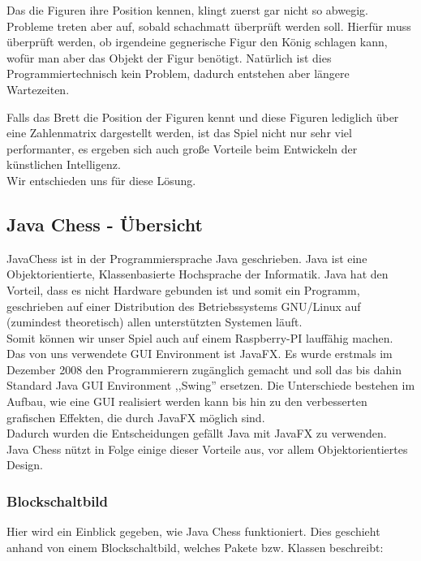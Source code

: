 \documentclass[12pt,a4paper]{article}
\begin{document}
{Das die Figuren ihre Position kennen, klingt zuerst gar nicht so abwegig. Probleme treten aber auf, sobald schachmatt überprüft werden soll. Hierfür muss überprüft werden, ob irgendeine gegnerische Figur den König schlagen kann, wofür man aber das Objekt der Figur benötigt. Natürlich ist dies Programmiertechnisch kein Problem, dadurch entstehen aber längere Wartezeiten. 


Falls das Brett die Position der Figuren kennt und diese Figuren lediglich über eine Zahlenmatrix dargestellt werden, ist das Spiel nicht nur sehr viel performanter, es ergeben sich auch große Vorteile beim Entwickeln der künstlichen Intelligenz. \\ 
Wir entschieden uns für diese Lösung.

\subsection{Java Chess - Übersicht}
\label{SUBSEC:JAVACHESS-OVERVIEW}

JavaChess ist in der Programmiersprache Java geschrieben. Java ist eine Objektorientierte, Klassenbasierte Hochsprache der Informatik. Java hat den Vorteil, dass es nicht Hardware gebunden ist und somit ein Programm, geschrieben auf einer Distribution des Betriebssystems GNU/Linux auf (zumindest theoretisch) allen unterstützten Systemen läuft. \\
Somit können wir unser Spiel auch auf einem Raspberry-PI lauffähig machen. \\
Das von uns verwendete \acl{GUI} Environment ist JavaFX. Es wurde erstmals im Dezember 2008 den Programmierern zugänglich gemacht und soll das bis dahin Standard Java GUI Environment ,,Swing'' ersetzen. Die Unterschiede bestehen im Aufbau, wie eine GUI realisiert werden kann bis hin zu den verbesserten grafischen Effekten, die durch JavaFX möglich sind. \\

Dadurch wurden die Entscheidungen gefällt Java mit JavaFX zu verwenden.\\
Java Chess nützt in Folge einige dieser Vorteile aus, vor allem Objektorientiertes Design. 


\subsubsection{Blockschaltbild}
\label{SUBSUBSEC:BLOCKSCHALTBILD}

Hier wird ein Einblick gegeben, wie Java Chess funktioniert. Dies geschieht anhand von einem Blockschaltbild, welches Pakete bzw. Klassen beschreibt: \\
\vspace{1cm}


}
\end{document}
